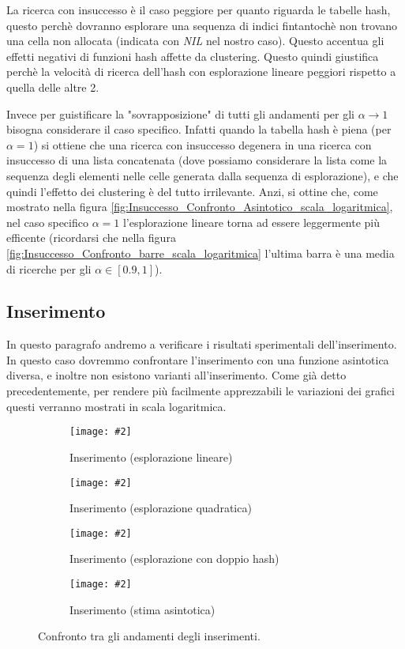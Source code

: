 \documentclass{article}
\newcommand{\image}[3][1]{
	\centering
	\texttt{[image: \#2]}
	\caption{#3}
}
\begin{document}
La ricerca con insuccesso è il caso peggiore per quanto riguarda le tabelle hash, questo perchè dovranno esplorare una sequenza di indici fintantochè non trovano una cella non allocata (indicata con \emph{NIL} nel nostro caso). Questo accentua gli effetti negativi di funzioni hash affette da clustering. Questo quindi giustifica perchè la velocità di ricerca dell'hash con esplorazione lineare peggiori rispetto a quella delle altre 2.

Invece per guistificare la "sovrapposizione" di tutti gli andamenti per gli $\alpha \longrightarrow 1$ bisogna considerare il caso specifico. Infatti quando la tabella hash è piena (per $\alpha = 1$) si ottiene che una ricerca con insuccesso degenera in una ricerca con insuccesso di una lista concatenata (dove possiamo considerare la lista come la sequenza degli elementi nelle celle generata dalla sequenza di esplorazione), e che quindi l'effetto dei clustering è del tutto irrilevante. Anzi, si ottine che, come mostrato nella figura \ref{fig:Insuccesso_Confronto_Asintotico_scala_logaritmica}, nel caso specifico $\alpha = 1$ l'esplorazione lineare torna ad essere leggermente più efficente (ricordarsi che nella figura \ref{fig:Insuccesso_Confronto_barre_scala_logaritmica} l'ultima barra è una media di ricerche per gli $\alpha \in [0.9, 1]$).

\subsection{Inserimento}
In questo paragrafo andremo a verificare i risultati sperimentali dell'inserimento. In questo caso dovremmo confrontare l'inserimento con una funzione asintotica diversa, e inoltre non esistono varianti all'inserimento. Come già detto precedentemente, per rendere più facilmente apprezzabili le variazioni dei grafici questi verranno mostrati in scala logaritmica.

\begin{figure}[H]
\begin{subfigure}[b]{0.5\textwidth}
\image{Inserimento_Lineare_scala_logaritmica}{Inserimento (esplorazione lineare)}
\end{subfigure}
\begin{subfigure}[b]{0.5\textwidth}
\image{Inserimento_Quadratico_scala_logaritmica}{Inserimento (esplorazione quadratica)}
\end{subfigure}
\begin{subfigure}[b]{0.5\textwidth}
\image{Inserimento_Doppio_scala_logaritmica}{Inserimento (esplorazione con doppio hash)}
\end{subfigure}
\begin{subfigure}[b]{0.5\textwidth}
\image{Inserimento_Asintotica_scala_logaritmica}{Inserimento (stima asintotica)}
\end{subfigure}
\caption{Confronto tra gli andamenti degli inserimenti.}
\label{fig:Inserimento_quartetto}
\end{figure}
\end{document}
